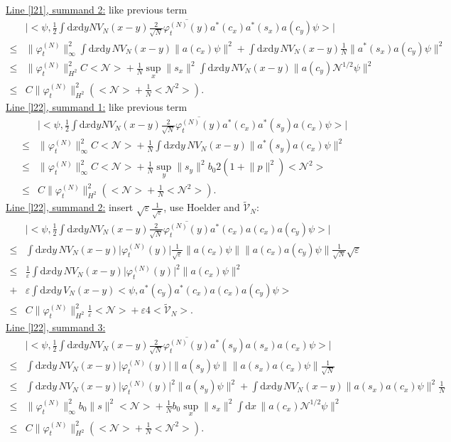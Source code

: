 \documentclass[11pt,a4paper]{scrartcl}
\newcommand{\di}{\textrm{d}}		%
\newcommand{\Ncal}{\mathcal{N}}		%
\newcommand{\tilV}{\tilde{\mathcal{V}}_N}		%
\newcommand{\estlist}[2]{\underline{Line \ref{l#1}, summand #2:}}
\newcommand{\scal}[2]{\big<#1,#2\big>} %
\newcommand{\cc}[1]{\overline{#1}}	%
\newcommand{\norm}[1]{\lVert#1\rVert}	%
\newcommand{\ev}[1]{\big<#1\big>}	%
\newcommand{\ph}{\varphi_t^{(N)}}	%
\newcommand{\dxyNV}{\frac{1}{2}\int \di x\di y N V_N(x-y)} %
\begin{document}
\estlist{21}{2} like previous term
\begin{align*}
 & \lvert \scal{\psi}{\dxyNV \frac{2}{\sqrt{N}}\cc{\ph(y)} a^\ast(c_x) a^\ast(s_x) a(c_y)\psi } \rvert \\
\leq & \norm{\ph}_\infty^2 \int \di x\di y\, N V_N(x-y) \norm{a(c_x)\psi}^2 + \int \di x\di y\, NV_N(x-y) \frac{1}{N} \norm{a^\ast(s_x)a(c_y)\psi}^2 \\
\leq & \norm{\ph}_{H^2}^2 C \ev{\Ncal} + \frac{1}{N} \sup_x \norm{s_x}^2 \int \di x\di y\, NV_N(x-y) \norm{a(c_y)\Ncal^{1/2}\psi}^2 \\
\leq & C\norm{\ph}_{H^2}^2 \left( \ev{\Ncal} + \frac{1}{N}\ev{\Ncal^2} \right).
\end{align*}
\estlist{22}{1} like previous term
\begin{align*}
& \lvert \scal{\psi}{\dxyNV \frac{2}{\sqrt{N}}\cc{\ph(y)} a^\ast(c_x) a^\ast(s_y) a(c_x)\psi } \rvert \\
\leq & \norm{\ph}_\infty^2 C \ev{\Ncal} + \frac{1}{N} \int \di x\di y\, NV_N(x-y) \norm{a^\ast(s_y)a(c_x)\psi}^2 \\
\leq & \norm{\ph}_\infty^2 C \ev{\Ncal} + \frac{1}{N}\sup_y \norm{s_y}^2 b_0 2(1+\norm{p}^2) \ev{\Ncal^2} \\
\leq & C\norm{\ph}_{H^2}^2 \left( \ev{\Ncal} + \frac{1}{N}\ev{\Ncal^2} \right).
\end{align*}
\estlist{22}{2} insert $\sqrt{\varepsilon} \frac{1}{\sqrt{\varepsilon}}$, use Hoelder and $\tilV$:
\begin{align*}
 & \lvert \scal{\psi}{\dxyNV \frac{2}{\sqrt{N}}\cc{\ph(y)} a^\ast(c_x)a(c_x)a(c_y)\psi} \rvert \\
\leq & \int \di x\di y\, NV_N(x-y) \lvert \ph(y)\rvert \frac{1}{\sqrt{\varepsilon}} \norm{a(c_x)\psi} \norm{a(c_x)a(c_y)\psi} \frac{1}{\sqrt{N}}\sqrt{\varepsilon} \\
\leq & \frac{1}{\varepsilon}\int \di x\di y\, NV_N(x-y) \lvert \ph(y)\rvert^2
  \norm{a(c_x)\psi}^2 \\
  + & \varepsilon \int \di x\di y\, V_N(x-y) \scal{\psi}{a^\ast(c_y)a^\ast(c_x)a(c_x)a(c_y) \psi} \\
\leq & C\norm{\ph}_{H^2}^2 \frac{1}{\varepsilon}\ev{\Ncal} + \varepsilon 4\ev{\tilV}.
\end{align*}
\estlist{22}{3}
\begin{align*}
& \lvert \scal{\psi}{\dxyNV \frac{2}{\sqrt{N}} \cc{\ph(y)}a^\ast(s_y)a(s_x)a(c_x)\psi} \rvert \\
\leq & \int \di x\di y\, NV_N(x-y) \lvert \ph(y)\rvert \norm{a(s_y)\psi} \norm{a(s_x)a(c_x)\psi}\frac{1}{\sqrt{N}} \\
\leq & \int \di x \di y\, NV_N(x-y) \lvert\ph(y)\rvert^2 \norm{a(s_y)\psi}^2 + \int \di x\di y\, NV_N(x-y) \norm{a(s_x)a(c_x)\psi}^2 \frac{1}{N} \\
\leq & \norm{\ph}_\infty^2 b_0 \norm{s}^2 \ev{\Ncal} + \frac{1}{N}b_0 \sup_x\norm{s_x}^2 \int \di x\, \norm{a(c_x)\Ncal^{1/2}\psi}^2 \\
\leq & C \norm{\ph}_{H^2}^2 \left( \ev{\Ncal} + \frac{1}{N}\ev{\Ncal^2}\right). 
\end{align*}
\end{document}
